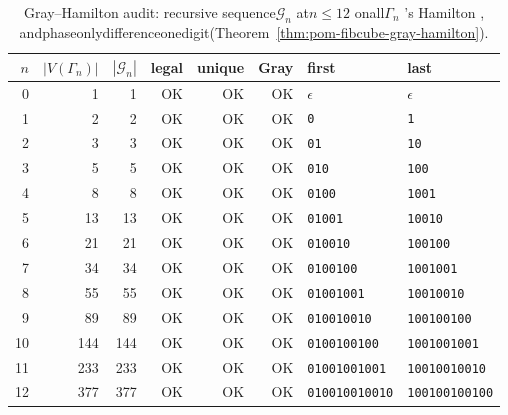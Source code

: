\begin{table}[H]
\centering
\scriptsize
\setlength{\tabcolsep}{5pt}
\caption{Gray--Hamilton audit: recursive sequence$\mathcal G_n$ at$n\le 12$ onall$\Gamma_n$ 's  Hamilton , andphaseonlydifferenceonedigit(Theorem~\ref{thm:pom-fibcube-gray-hamilton}). }
\label{tab:fibonacci_cube_gray_hamilton_audit}
\begin{tabular}{r r r r r r l l}
\toprule
$n$ & $|V(\Gamma_n)|$ & $|\mathcal G_n|$ & legal & unique & Gray & first & last\\
\midrule
0 & 1 & 1 & OK & OK & OK & \texttt{\ensuremath{\epsilon}} & \texttt{\ensuremath{\epsilon}}\\
1 & 2 & 2 & OK & OK & OK & \texttt{0} & \texttt{1}\\
2 & 3 & 3 & OK & OK & OK & \texttt{01} & \texttt{10}\\
3 & 5 & 5 & OK & OK & OK & \texttt{010} & \texttt{100}\\
4 & 8 & 8 & OK & OK & OK & \texttt{0100} & \texttt{1001}\\
5 & 13 & 13 & OK & OK & OK & \texttt{01001} & \texttt{10010}\\
6 & 21 & 21 & OK & OK & OK & \texttt{010010} & \texttt{100100}\\
7 & 34 & 34 & OK & OK & OK & \texttt{0100100} & \texttt{1001001}\\
8 & 55 & 55 & OK & OK & OK & \texttt{01001001} & \texttt{10010010}\\
9 & 89 & 89 & OK & OK & OK & \texttt{010010010} & \texttt{100100100}\\
10 & 144 & 144 & OK & OK & OK & \texttt{0100100100} & \texttt{1001001001}\\
11 & 233 & 233 & OK & OK & OK & \texttt{01001001001} & \texttt{10010010010}\\
12 & 377 & 377 & OK & OK & OK & \texttt{010010010010} & \texttt{100100100100}\\
\bottomrule
\end{tabular}
\end{table}
